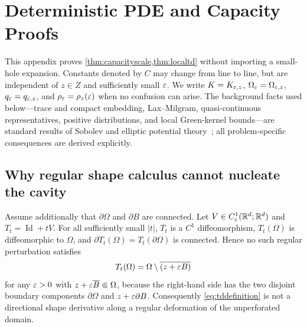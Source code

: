 \section{Deterministic PDE and Capacity Proofs}
\label{app:deterministic}

This appendix proves \cref{thm:capacityscale,thm:localtd} without importing a
small-hole expansion.  Constants denoted by $C$ may change from line to line,
but are independent of $z\in Z$ and sufficiently small $\varepsilon$.  We write
$K=K_{\varepsilon,z}$, $\Omega_\varepsilon=\Omega_{\varepsilon,z}$,
$q_\varepsilon=q_{\varepsilon,z}$, and $\rho_\varepsilon=\rho_z(\varepsilon)$ when no confusion can
arise.  The background facts used below---trace and compact embedding,
Lax--Milgram, quasi-continuous representatives, positive distributions, and
local Green-kernel bounds---are standard results of Sobolev and elliptic
potential theory~\cite{evans2010pde,adams1996function,gilbarg2001elliptic}; all
problem-specific consequences are derived explicitly.

\subsection{Why regular shape calculus cannot nucleate the cavity}
\label{app:notshapepath}

\begin{proposition}
\label{prop:notshapepath}
Assume additionally that $\partial\Omega$ and $\partial B$ are connected.
Let $V\in C^1_c(\mathbb{R}^d;\mathbb{R}^d)$ and
$T_t=\operatorname{Id}+tV$.  For all sufficiently small $|t|$, $T_t$ is a
$C^1$ diffeomorphism, $T_t(\Omega)$ is diffeomorphic to $\Omega$, and
$\partial T_t(\Omega)=T_t(\partial\Omega)$ is connected.  Hence no such
regular perturbation satisfies
\begin{equation}
 T_t(\Omega)=\Omega\setminus\overline{(z+\varepsilon B)}
 \label{eq:noshapepath}
\end{equation}
for any $\varepsilon>0$ with $z+\varepsilon\overline B\Subset\Omega$, because the right-hand
side has the two disjoint boundary components $\partial\Omega$ and
$z+\varepsilon\partial B$.  Consequently \cref{eq:tddefinition} is not a directional
shape derivative along a regular deformation of the unperforated domain.
\end{proposition}

